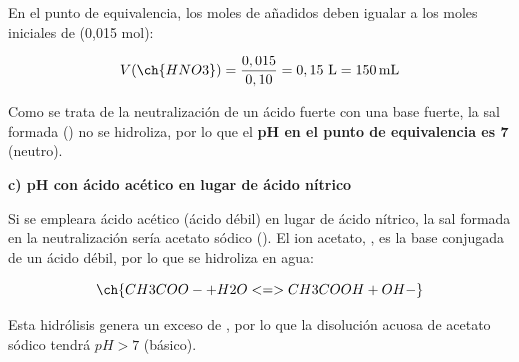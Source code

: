 \begin{exerciseEVAU}
\begin{solu}
    En el punto de equivalencia, los moles de  añadidos deben igualar a los moles iniciales de  (0,015 mol):

    \begin{equation*}
        V(\ch{HNO3}) = \dfrac{0,015}{0,10} = 0,15 \ \si{\litre} = \SI{150}{\milli\litre}
    \end{equation*}

    Como se trata de la neutralización de un ácido fuerte con una base fuerte, la sal formada () no se hidroliza, por lo que el \textbf{pH en el punto de equivalencia es 7} (neutro).

    \textbf{c) pH con ácido acético en lugar de ácido nítrico}

    Si se empleara ácido acético (ácido débil) en lugar de ácido nítrico, la sal formada en la neutralización sería acetato sódico (). El ion acetato, , es la base conjugada de un ácido débil, por lo que se hidroliza en agua:

    \begin{equation*}
        \ch{CH3COO- + H2O <=> CH3COOH + OH-}
    \end{equation*}

    Esta hidrólisis genera un exceso de , por lo que la disolución acuosa de acetato sódico tendrá \( pH > 7 \) (básico).

\end{solu}
\end{exerciseEVAU}

